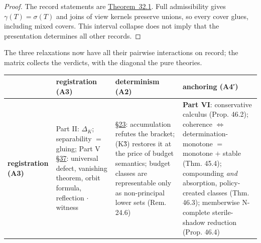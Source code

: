 \begin{proof}

The record statements are \hyperlink{stmt:32.1}{Theorem~32.1}. Full admissibility gives \(\gamma(T)=\sigma(T)\) and joins of view kernels preserve unions, so every cover glues, including mixed covers. This interval collapse does not imply that the presentation determines all other records.
\end{proof}


The three relaxations now have all their pairwise interactions on record; the matrix collects the verdicts, with the diagonal the pure theories.

{\def\LTcaptype{none} %
\begin{longtable}[]{@{}
  >{\raggedright\arraybackslash}p{}
  >{\raggedright\arraybackslash}p{}
  >{\raggedright\arraybackslash}p{}
  >{\raggedright\arraybackslash}p{}@{}}
\toprule\noalign{}
\begin{minipage}[b]{\linewidth}\raggedright
\end{minipage} & \begin{minipage}[b]{\linewidth}\raggedright
registration (A3)
\end{minipage} & \begin{minipage}[b]{\linewidth}\raggedright
determinism (A2)
\end{minipage} & \begin{minipage}[b]{\linewidth}\raggedright
anchoring (A4′)
\end{minipage} \\
\midrule\noalign{}
\endhead
\bottomrule\noalign{}
\endlastfoot
\textbf{registration (A3)} & Part II: \(\Delta_K\); separability \(=\) gluing; Part V \hyperlink{sec:37}{§37}: universal defect, vanishing theorem, orbit formula, reflection \(\cdot\) witness & \hyperlink{sec:23}{§23}: accumulation refutes the bracket; (K3̂) restores it at the price of budget semantics; budget classes are representable only as non-principal lower sets (Rem. 24.6) & \textbf{Part VI}: conservative calculus (Prop. 46.2); coherence \(\iff\) determination-monotone \(=\) monotone \(+\) stable (Thm. 45.4); compounding \emph{and} absorption, policy-created classes (Thm. 46.3); memberwise N-complete sterile-shadow reduction (Prop. 46.4) \\

\end{longtable}}
